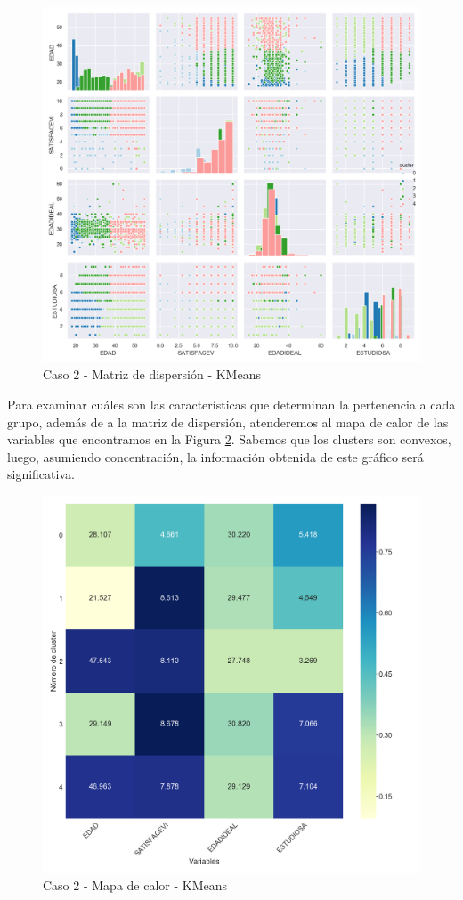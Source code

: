 \documentclass[a4paper, 20pt]{article}
\begin{document}
\begin{figure}[H]
    \centering
    \includegraphics[width=1\textwidth]{./caso2/KMeans_scattermatrix}
    \caption{Caso 2 - Matriz de dispersión - KMeans}
    \label{fig:KMeans_scattermatrix2}
\end{figure}

Para examinar cuáles son las características que determinan la pertenencia a cada grupo, además de a la matriz de dispersión, atenderemos al mapa de calor de las variables que encontramos en la Figura \ref{fig:KMeans_heatmap2}. Sabemos que los clusters son convexos, luego, asumiendo concentración, la información obtenida de este gráfico será significativa.

\begin{figure}[H]
    \centering
    \includegraphics[width=1\textwidth]{./caso2/KMeans_heatmap}
    \caption{Caso 2 - Mapa de calor - KMeans}
    \label{fig:KMeans_heatmap2}
\end{figure}
\end{document}
